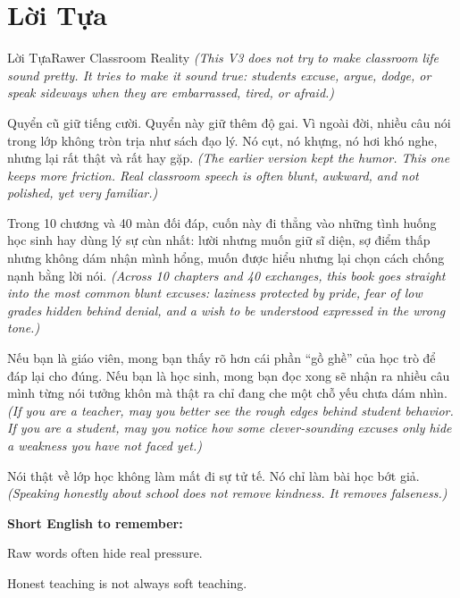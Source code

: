 \chapter*{Lời Tựa}

\begin{truyen}{Lời Tựa}{Rawer Classroom Reality}
\textit{(This V3 does not try to make classroom life sound pretty. It tries to make it sound true: students excuse, argue, dodge, or speak sideways when they are embarrassed, tired, or afraid.)}

Quyển cũ giữ tiếng cười. Quyển này giữ thêm độ gai. Vì ngoài đời, nhiều câu nói trong lớp không tròn trịa như sách đạo lý. Nó cụt, nó khựng, nó hơi khó nghe, nhưng lại rất thật và rất hay gặp.
\textit{(The earlier version kept the humor. This one keeps more friction. Real classroom speech is often blunt, awkward, and not polished, yet very familiar.)}

Trong 10 chương và 40 màn đối đáp, cuốn này đi thẳng vào những tình huống học sinh hay dùng lý sự cùn nhất: lười nhưng muốn giữ sĩ diện, sợ điểm thấp nhưng không dám nhận mình hổng, muốn được hiểu nhưng lại chọn cách chống nạnh bằng lời nói.
\textit{(Across 10 chapters and 40 exchanges, this book goes straight into the most common blunt excuses: laziness protected by pride, fear of low grades hidden behind denial, and a wish to be understood expressed in the wrong tone.)}

Nếu bạn là giáo viên, mong bạn thấy rõ hơn cái phần ``gồ ghề'' của học trò để đáp lại cho đúng. Nếu bạn là học sinh, mong bạn đọc xong sẽ nhận ra nhiều câu mình từng nói tưởng khôn mà thật ra chỉ đang che một chỗ yếu chưa dám nhìn.
\textit{(If you are a teacher, may you better see the rough edges behind student behavior. If you are a student, may you notice how some clever-sounding excuses only hide a weakness you have not faced yet.)}
\end{truyen}

\begin{baihoc}
Nói thật về lớp học không làm mất đi sự tử tế. Nó chỉ làm bài học bớt giả.
\textit{(Speaking honestly about school does not remove kindness. It removes falseness.)}
\end{baihoc}

\begin{ghinhoanh}
\textbf{Short English to remember:}

Raw words often hide real pressure.

Honest teaching is not always soft teaching.
\end{ghinhoanh}

